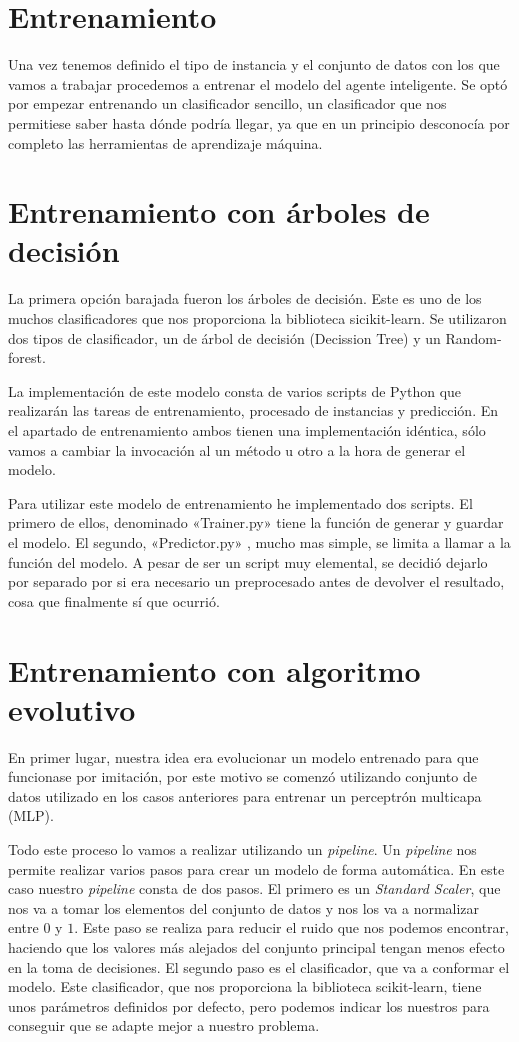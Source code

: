 \section{Entrenamiento}
Una vez tenemos definido el tipo de instancia y el conjunto de datos con los que vamos a trabajar procedemos a entrenar el modelo del agente inteligente. Se optó por empezar entrenando un clasificador sencillo, un clasificador que nos permitiese saber hasta dónde podría llegar, ya que en un principio desconocía por completo las herramientas de aprendizaje máquina.

\section{Entrenamiento con árboles de decisión}

La primera opción barajada fueron los árboles de decisión. Este es uno de los muchos clasificadores que nos proporciona la biblioteca sicikit-learn. Se utilizaron dos tipos de clasificador, un de árbol de decisión (Decission Tree) y un Random-forest. 

 La implementación de este modelo consta de varios scripts de Python que realizarán las tareas de entrenamiento, procesado de instancias y predicción. En el apartado de entrenamiento ambos tienen una implementación idéntica, sólo vamos a cambiar la invocación al un método u otro a la hora de generar el modelo.
 
 
 Para utilizar este modelo de entrenamiento he implementado dos scripts. El primero de ellos, denominado «Trainer.py» tiene la función de generar y guardar el modelo. El segundo, «Predictor.py» , mucho mas simple, se limita a llamar a la función  del modelo. A pesar de ser un script muy elemental, se decidió dejarlo por separado por si era necesario un preprocesado antes de devolver el resultado, cosa que finalmente sí que ocurrió. 
 

\section{Entrenamiento con algoritmo evolutivo}

En primer lugar, nuestra idea era evolucionar un modelo entrenado para que funcionase por imitación, por este motivo se comenzó utilizando conjunto de datos utilizado en los casos anteriores para entrenar un perceptrón multicapa (MLP). 

Todo este proceso lo vamos a realizar utilizando un \emph{pipeline}. Un \emph{pipeline} nos permite realizar varios pasos para crear un modelo de forma automática. En este caso nuestro \emph{pipeline} consta de dos pasos. El primero es un \emph{Standard Scaler}, que nos va a tomar los elementos del conjunto de datos y nos los va a normalizar entre $0$ y $1$. Este paso se realiza para reducir el ruido que nos podemos encontrar, haciendo que los valores más alejados del conjunto principal tengan menos efecto en la toma de decisiones. El segundo paso es el clasificador, que va a conformar el modelo. Este clasificador, que nos proporciona la biblioteca scikit-learn, tiene unos parámetros definidos por defecto, pero podemos indicar los nuestros para conseguir que se adapte mejor a nuestro problema.

